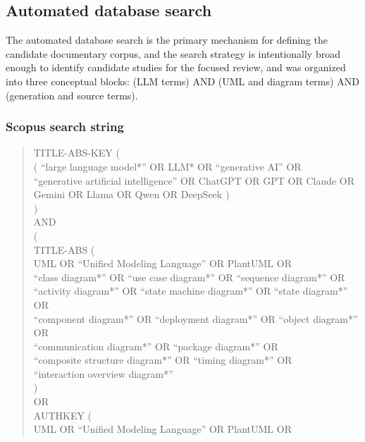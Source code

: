 \subsection{Automated database search}

The automated database search is the primary mechanism for defining the candidate documentary corpus, and the search strategy is intentionally broad enough to identify candidate studies for the focused review, and was organized into three conceptual blocks: (LLM terms) AND (UML and diagram terms) AND (generation and source terms).  

\subsubsection{Scopus search string}

\begin{quote}
\begin{minipage}{0.96\textwidth}
\scriptsize\ttfamily\raggedright
TITLE-ABS-KEY (\\
\quad ( ``large language model*'' OR LLM* OR ``generative AI'' OR\\
\quad ``generative artificial intelligence'' OR ChatGPT OR GPT OR Claude OR\\
\quad Gemini OR Llama OR Qwen OR DeepSeek )\\
)\\
AND\\
(\\
\quad TITLE-ABS (\\
\qquad UML OR ``Unified Modeling Language'' OR PlantUML OR\\
\qquad ``class diagram*'' OR ``use case diagram*'' OR ``sequence diagram*'' OR\\
\qquad ``activity diagram*'' OR ``state machine diagram*'' OR ``state diagram*'' OR\\
\qquad ``component diagram*'' OR ``deployment diagram*'' OR ``object diagram*'' OR\\
\qquad ``communication diagram*'' OR ``package diagram*'' OR\\
\qquad ``composite structure diagram*'' OR ``timing diagram*'' OR\\
\qquad ``interaction overview diagram*''\\
\quad )\\
\quad OR\\
\quad AUTHKEY (\\
\qquad UML OR ``Unified Modeling Language'' OR PlantUML OR\\

\end{minipage}
\end{quote}
